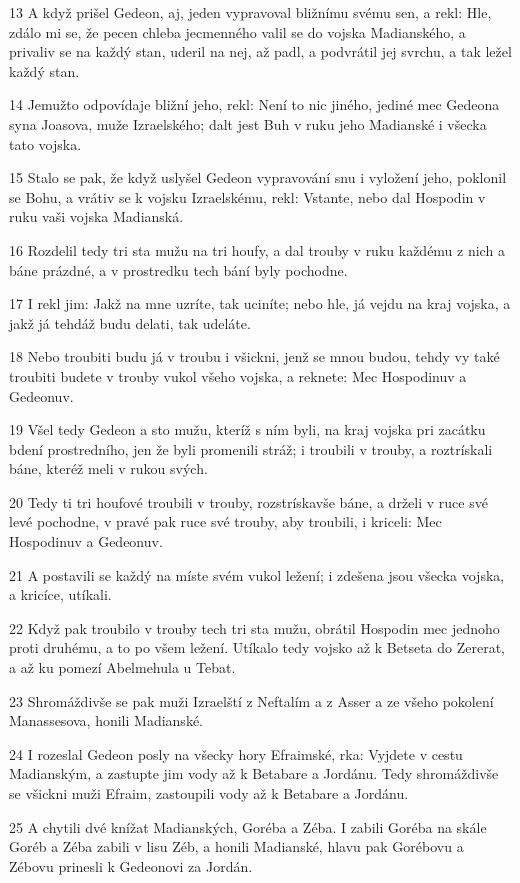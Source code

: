\par 13 A když prišel Gedeon, aj, jeden vypravoval bližnímu svému sen, a rekl: Hle, zdálo mi se, že pecen chleba jecmenného valil se do vojska Madianského, a privaliv se na každý stan, uderil na nej, až padl, a podvrátil jej svrchu, a tak ležel každý stan.
\par 14 Jemužto odpovídaje bližní jeho, rekl: Není to nic jiného, jediné mec Gedeona syna Joasova, muže Izraelského; dalt jest Buh v ruku jeho Madianské i všecka tato vojska.
\par 15 Stalo se pak, že když uslyšel Gedeon vypravování snu i vyložení jeho, poklonil se Bohu, a vrátiv se k vojsku Izraelskému, rekl: Vstante, nebo dal Hospodin v ruku vaši vojska Madianská.
\par 16 Rozdelil tedy tri sta mužu na tri houfy, a dal trouby v ruku každému z nich a báne prázdné, a v prostredku tech bání byly pochodne.
\par 17 I rekl jim: Jakž na mne uzríte, tak uciníte; nebo hle, já vejdu na kraj vojska, a jakž já tehdáž budu delati, tak udeláte.
\par 18 Nebo troubiti budu já v troubu i všickni, jenž se mnou budou, tehdy vy také troubiti budete v trouby vukol všeho vojska, a reknete: Mec Hospodinuv a Gedeonuv.
\par 19 Všel tedy Gedeon a sto mužu, kteríž s ním byli, na kraj vojska pri zacátku bdení prostredního, jen že byli promenili stráž; i troubili v trouby, a roztrískali báne, kteréž meli v rukou svých.
\par 20 Tedy ti tri houfové troubili v trouby, rozstrískavše báne, a drželi v ruce své levé pochodne, v pravé pak ruce své trouby, aby troubili, i kriceli: Mec Hospodinuv a Gedeonuv.
\par 21 A postavili se každý na míste svém vukol ležení; i zdešena jsou všecka vojska, a kricíce, utíkali.
\par 22 Když pak troubilo v trouby tech tri sta mužu, obrátil Hospodin mec jednoho proti druhému, a to po všem ležení. Utíkalo tedy vojsko až k Betseta do Zererat, a až ku pomezí Abelmehula u Tebat.
\par 23 Shromáždivše se pak muži Izraelští z Neftalím a z Asser a ze všeho pokolení Manassesova, honili Madianské.
\par 24 I rozeslal Gedeon posly na všecky hory Efraimské, rka: Vyjdete v cestu Madianským, a zastupte jim vody až k Betabare a Jordánu. Tedy shromáždivše se všickni muži Efraim, zastoupili vody až k Betabare a Jordánu.
\par 25 A chytili dvé knížat Madianských, Goréba a Zéba. I zabili Goréba na skále Goréb a Zéba zabili v lisu Zéb, a honili Madianské, hlavu pak Gorébovu a Zébovu prinesli k Gedeonovi za Jordán.

